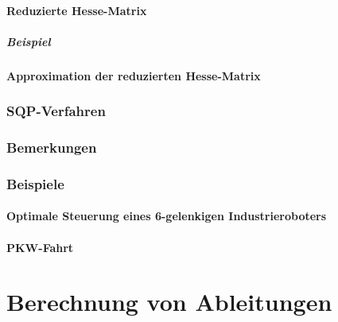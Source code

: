             \subsubsection{Reduzierte Hesse-Matrix} %

                \paragraph{Beispiel} %

            \subsubsection{Approximation der reduzierten Hesse-Matrix} %

        \subsection{SQP-Verfahren} %

        \subsection{Bemerkungen} %

        \subsection{Beispiele} %

            \subsubsection{Optimale Steuerung eines 6-gelenkigen Industrieroboters} %

            \subsubsection{PKW-Fahrt} %

\chapter{Berechnung von Ableitungen} %

